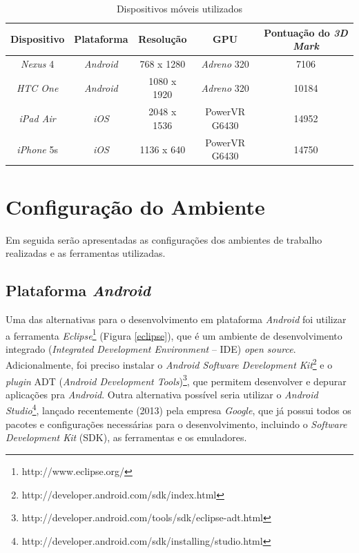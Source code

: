 \begin{table}[ht]
	\centering	
	\begin{tabular}{ccccc}
		\toprule
		\textbf{Dispositivo} & \textbf{Plataforma}  & \textbf{Resolução} & \textbf{GPU} & \textbf{Pontuação do \textit{3D Mark}} \\
		\midrule
		\textit{Nexus} 4 &  \textit{Android} & 768 x 1280 &  \textit{Adreno} 320 & 7106\\
		\textit{HTC One} &  \textit{Android} & 1080 x 1920 &  \textit{Adreno} 320 & 10184\\ 
		\textit{iPad Air} &  \textit{iOS} & 2048 x 1536  &  PowerVR G6430 & 14952\\
		\textit{iPhone} 5s &  \textit{iOS} & 1136 x 640  &  PowerVR G6430 & 14750\\
		\bottomrule
	\end{tabular}
	\caption{Dispositivos móveis utilizados}
	\label{equipamentos}
\end{table}


\section{Configuração do Ambiente}
\label{configamb}	

	Em seguida serão apresentadas as configurações dos ambientes de trabalho realizadas e as ferramentas utilizadas.

\subsection{Plataforma \textit{Android}}

	Uma das alternativas para o desenvolvimento em plataforma \textit{Android} foi utilizar a ferramenta \textit{Eclipse}\footnote{http://www.eclipse.org/} (Figura \ref{eclipse}), que é um ambiente de desenvolvimento integrado (\textit{Integrated Development Environment} -- IDE) \textit{open source}. Adicionalmente, foi preciso instalar o \textit{Android Software Development Kit}\footnote{http://developer.android.com/sdk/index.html} e o \textit{plugin} ADT (\textit{Android Development Tools})\footnote{http://developer.android.com/tools/sdk/eclipse-adt.html}, que permitem desenvolver e depurar aplicações pra \textit{Android}. Outra alternativa possível seria utilizar o \textit{Android Studio}\footnote{http://developer.android.com/sdk/installing/studio.html}, lançado recentemente (2013) pela empresa \textit{Google}, que já possui todos os pacotes e configurações necessárias para o desenvolvimento, incluindo o  \textit{Software Development Kit} (SDK), as ferramentas e os emuladores. 

